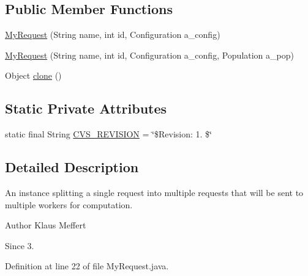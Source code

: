 \subsection*{Public Member Functions}
\begin{DoxyCompactItemize}
\item 
\hyperlink{classexamples_1_1grid_1_1fitness_distributed_1_1_my_request_a36d1de268582c9d357928813799fa892}{My\-Request} (String name, int id, Configuration a\-\_\-config)
\item 
\hyperlink{classexamples_1_1grid_1_1fitness_distributed_1_1_my_request_af5ce68fdb3734a8a324b3b115cc0ce67}{My\-Request} (String name, int id, Configuration a\-\_\-config, Population a\-\_\-pop)
\item 
Object \hyperlink{classexamples_1_1grid_1_1fitness_distributed_1_1_my_request_ab07cdf70c302e7d0c5fb05b08327122e}{clone} ()
\end{DoxyCompactItemize}
\subsection*{Static Private Attributes}
\begin{DoxyCompactItemize}
\item 
static final String \hyperlink{classexamples_1_1grid_1_1fitness_distributed_1_1_my_request_ac3905b29372b6986f484917f031a8dca}{C\-V\-S\-\_\-\-R\-E\-V\-I\-S\-I\-O\-N} = \char`\"{}\$Revision\-: 1. \$\char`\"{}
\end{DoxyCompactItemize}


\subsection{Detailed Description}
An instance splitting a single request into multiple requests that will be sent to multiple workers for computation.

\begin{DoxyAuthor}{Author}
Klaus Meffert 
\end{DoxyAuthor}
\begin{DoxySince}{Since}
3. 
\end{DoxySince}


Definition at line 22 of file My\-Request.\-java.



